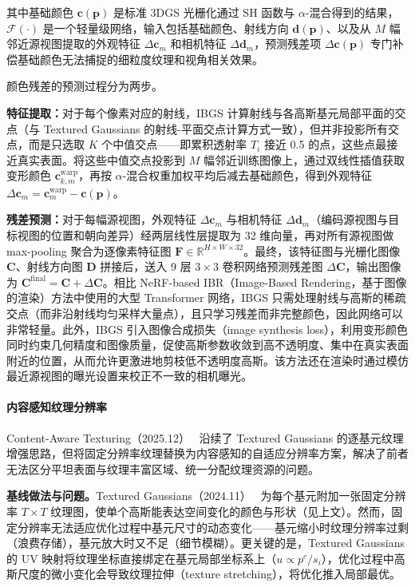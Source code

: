 其中基础颜色 $\mathbf{c}(\mathbf{p})$ 是标准 3DGS 光栅化通过 SH 函数与 $\alpha$-混合得到的结果，$\mathcal{F}(\cdot)$ 是一个轻量级网络，输入包括基础颜色、射线方向 $\mathbf{d}(\mathbf{p})$、以及从 $M$ 幅邻近源视图提取的外观特征 $\Delta\mathbf{c}_m$ 和相机特征 $\Delta\mathbf{d}_m$，预测残差项 $\Delta\mathbf{c}(\mathbf{p})$ 专门补偿基础颜色无法捕捉的细粒度纹理和视角相关效果。

颜色残差的预测过程分为两步。

\textbf{特征提取：}对于每个像素对应的射线，IBGS 计算射线与各高斯基元局部平面的交点（与 Textured Gaussians 的射线-平面交点计算方式一致），但并非投影所有交点，而是只选取 $K$ 个中值交点——即累积透射率 $T_i$ 接近 0.5 的点，这些点最接近真实表面。将这些中值交点投影到 $M$ 幅邻近训练图像上，通过双线性插值获取变形颜色 $\mathbf{c}^{\mathrm{warp}}_{k,m}$，再按 $\alpha$-混合权重加权平均后减去基础颜色，得到外观特征 $\Delta\mathbf{c}_m = \mathbf{c}^{\mathrm{warp}}_m - \mathbf{c}(\mathbf{p})$。

\textbf{残差预测：}对于每幅源视图，外观特征 $\Delta\mathbf{c}_m$ 与相机特征 $\Delta\mathbf{d}_m$（编码源视图与目标视图的位置和朝向差异）经两层线性层提取为 32 维向量，再对所有源视图做 max-pooling 聚合为逐像素特征图 $\mathbf{F} \in \mathbb{R}^{H \times W \times 32}$。最终，该特征图与光栅化图像 $\mathbf{C}$、射线方向图 $\mathbf{D}$ 拼接后，送入 9 层 $3 \times 3$ 卷积网络预测残差图 $\Delta\mathbf{C}$，输出图像为 $\mathbf{C}^{\mathrm{final}} = \mathbf{C} + \Delta\mathbf{C}$。相比 NeRF-based IBR（Image-Based Rendering，基于图像的渲染）方法中使用的大型 Transformer 网络，IBGS 只需处理射线与高斯的稀疏交点（而非沿射线均匀采样大量点），且只学习残差而非完整颜色，因此网络可以非常轻量。此外，IBGS 引入图像合成损失（image synthesis loss），利用变形颜色同时约束几何精度和图像质量，促使高斯参数收敛到高不透明度、集中在真实表面附近的位置，从而允许更激进地剪枝低不透明度高斯。该方法还在渲染时通过模仿最近源视图的曝光设置来校正不一致的相机曝光。

\paragraph{内容感知纹理分辨率}

Content-Aware Texturing（2025.12）~\cite{2512_02621} 沿续了 Textured Gaussians 的逐基元纹理增强思路，但将固定分辨率纹理替换为内容感知的自适应分辨率方案，解决了前者无法区分平坦表面与纹理丰富区域、统一分配纹理资源的问题。

\textbf{基线做法与问题。}Textured Gaussians（2024.11）~\cite{2411_18625} 为每个基元附加一张固定分辨率 $T \times T$ 纹理图，使单个高斯能表达空间变化的颜色与形状（见上文）。然而，固定分辨率无法适应优化过程中基元尺寸的动态变化——基元缩小时纹理分辨率过剩（浪费存储），基元放大时又不足（细节模糊）。更关键的是，Textured Gaussians 的 UV 映射将纹理坐标直接绑定在基元局部坐标系上（$u \propto p^c / s_i$），优化过程中高斯尺度的微小变化会导致纹理拉伸（texture stretching），将优化推入局部最优。

